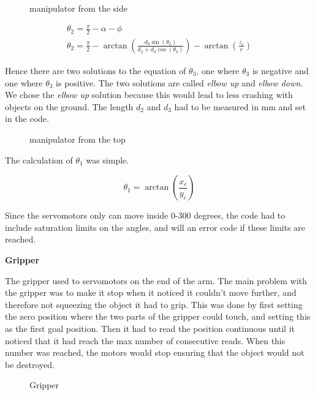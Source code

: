 \begin{figure}[H]
    \centering
    \caption{manipulator from the side}
    \label{fig:manipulator_side2} 
\end{figure}

\begin{displaymath}
\begin{split}
\theta_{2} = \frac{\pi}{2} - \alpha - \phi\\
\theta_{2} = \frac{\pi}{2} - \arctan(\frac{d_{3}\sin(\theta_{3})}{d_{2}+d_{3}\cos(\theta_{3})}) - \arctan(\frac{z_{c}}{r})
\end{split}
\end{displaymath}

Hence there are two solutions to the equation of $\theta_{3}$, one where $\theta_{3}$ is negative and one where $\theta_{3}$ is positive. The two solutions are called \textit{elbow up} and \textit{elbow down}. We chose the \textit{elbow up} solution because this would lead to less crashing with objects on the ground.
The length $d_{2}$ and $d_{3}$ had to be measured in mm and set in the code.

\begin{figure}[H]
    \centering
    \caption{manipulator from the top}
    \label{fig:manipulator_top} 
\end{figure}

The calculation of $\theta_{1}$ was simple.

$$\theta_{1} = \arctan(\frac{x_{c}}{y_{c}})$$

Since the servomotors only can move inside 0-300 degrees, the code had to include saturation limits on the angles, and will an error code if these limits are reached.
\bigskip

\textbf{Gripper}

The gripper used to servomotors on the end of the arm. The main problem with the gripper was to make it stop when it noticed it couldn't move further, and therefore not squeezing the object it had to grip. This was done by first setting the zero position where the two parts of the gripper could touch, and setting this as the first goal position. Then it had to read the position continuous until it noticed that it had reach the max number of consecutive reads. When this number was reached, the motors would stop ensuring that the object would not be destroyed.

\begin{figure}[H]
    \centering
    \caption{Gripper}
    \label{fig:gripper} 
\end{figure}

